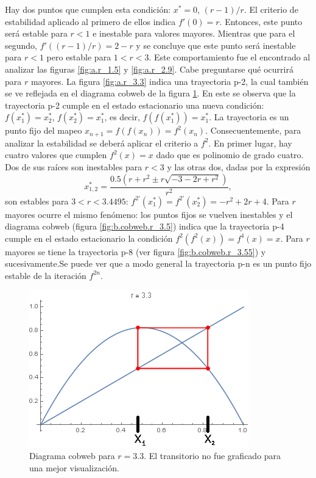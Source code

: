 \documentclass[aps,prb,twocolumn,superscriptaddress,floatfix,longbibliography]{revtex4-2}
\newcounter{para}
\begin{document}
Hay dos puntos que cumplen esta condición: $x^* = 0$, $(r-1)/r$. El criterio de estabilidad aplicado al primero de ellos indica $f'(0) = r$. Entonces, este punto será estable para $r<1$ e inestable para valores mayores. Mientras que para el segundo, $f'( (r-1)/r ) = 2 - r$ y se concluye que este punto será inestable para $r<1$ pero estable para $1<r<3$. Este comportamiento fue el encontrado al analizar las figuras \ref{fig:a.r_1.5} y \ref{fig:a.r_2.9}. Cabe preguntarse qué ocurrirá para $r$ mayores. La figura \ref{fig:a.r_3.3} indica una trayectoria p-2, la cual también se ve reflejada en el diagrama cobweb de la figura \ref{fig:b.cobweb.r_3.3}. En este se observa que la trayectoria p-2 cumple en el estado estacionario una nueva condición: $f(x_1^*) = x_2^*$, $f(x_2^*) = x_1^*$, es decir, $f(f(x_1^*)) = x_1^*$. La trayectoria es un punto fijo del mapeo $x_{n+1} = f(f(x_n)) = f^2(x_n)$. Consecuentemente, para analizar la estabilidad se deberá aplicar el criterio a $f^2$. En primer lugar, hay cuatro valores que cumplen $f^2(x) = x$ dado que es polinomio de grado cuatro. Dos de sus raíces son inestables para $r<3$ y las otras dos, dadas por la expresión
\[x_{1,2}^* = \frac{ 0.5(r + r^2 \pm r \sqrt{-3 -2 r + r^2})}{r^2},\]
son estables para $3 < r < 3.4495 $: $f^{2 \prime} (x_1^{*}) = f^{2 \prime} (x_2^{*}) = -r^2 + 2 r + 4$. Para $r$ mayores ocurre el mismo fenómeno: los puntos fijos se vuelven inestables y el diagrama cobweb (figura \ref{fig:b.cobweb.r_3.5}) indica que la trayectoria p-4 cumple en el estado estacionario la condición $f^{2}(f^2(x)) = f^4(x) = x$. Para $r$ mayores se tiene la trayectoria p-8 (ver figura \ref{fig:b.cobweb.r_3.55}) y sucesivamente.Se puede ver que a modo general la trayectoria p-n es un punto fijo estable de la iteración $f^{2n}$.

\begin{figure}[htp]
    \includegraphics[clip=true,width=0.7\columnwidth]{b.cobweb.r_3.3.png}
    \caption{Diagrama cobweb para $r = 3.3$. El transitorio no fue graficado para una mejor visualización.}
     \label{fig:b.cobweb.r_3.3}
\end{figure}
\end{document}
